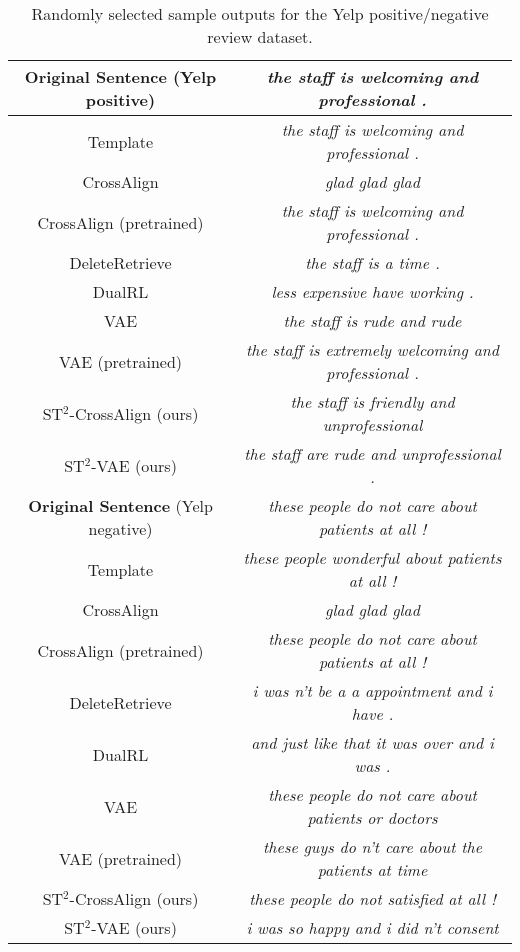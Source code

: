 \documentclass[11pt,a4paper]{article}
\begin{document}
\begin{table*}[th]\footnotesize
	\centering
	\begin{tabular}{c|c}
		\hline
		\textbf{Original Sentence} (Yelp positive) & \emph{the staff is welcoming and professional .} \\
		\hline
		Template & \emph{the staff is welcoming and professional .} \\
		CrossAlign & \emph{glad glad glad} \\
		CrossAlign (pretrained) & \emph{the staff is welcoming and professional .} \\
		DeleteRetrieve & \emph{the staff is a time .} \\
		DualRL & \emph{less expensive have working .} \\
		VAE & \emph{the staff is rude and rude} \\
		VAE (pretrained) & \emph{the staff is extremely welcoming and professional .} \\
		\hline
		ST$^2$-CrossAlign (ours) & \emph{the staff is friendly and unprofessional} \\
		ST$^2$-VAE (ours) & \emph{the staff are rude and unprofessional .} \\
		\hline
		\hline
		\textbf{Original Sentence} (Yelp negative) & \emph{these people do not care about patients at all !} \\
		\hline
		Template & \emph{these people wonderful about patients at all !} \\
		CrossAlign & \emph{glad glad glad} \\
		CrossAlign (pretrained) & \emph{these people do not care about patients at all !} \\
		DeleteRetrieve & \emph{i was n't be a a appointment and i have .} \\
		DualRL & \emph{and just like that it was over and i was .} \\
		VAE & \emph{these people do not care about patients or doctors} \\
		VAE (pretrained) & \emph{these guys do n't care about the patients at time} \\
		\hline
		ST$^2$-CrossAlign (ours) & \emph{these people do not satisfied at all !} \\
		ST$^2$-VAE (ours) & \emph{i was so happy and i did n't consent} \\
		\hline
	\end{tabular}
	\caption{Randomly selected sample outputs for the Yelp positive/negative review dataset.}\label{tb:qualmore}
\end{table*}
\end{document}
